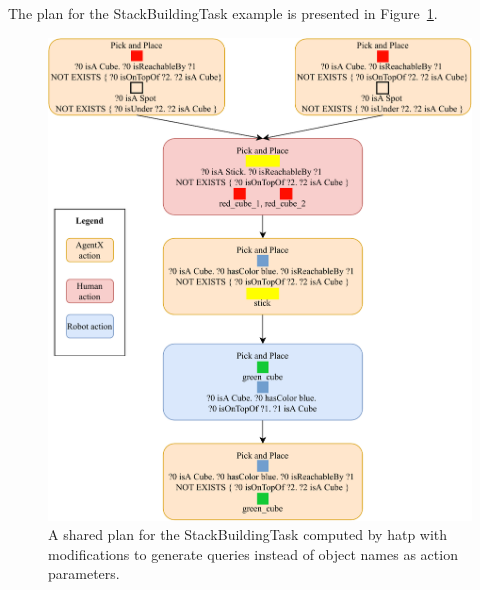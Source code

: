 \documentclass[a4paper,11pt,twoside]{StyleThese}
\begin{document}
The plan for the StackBuildingTask example is presented in Figure~\ref{chap6:fig:plan_hatp}.

\begin{figure}[!htb]
	\centering
	\includegraphics[width=\linewidth]{figures/chapter2/plan_hatp.pdf}
	\caption{A shared plan for the StackBuildingTask computed by \acrshort{hatp} with modifications to generate \sparql{} queries instead of object names as action parameters.}
	\label{chap6:fig:plan_hatp}
\end{figure}
\thispagestyle{example}
\end{document}
